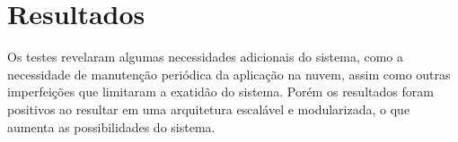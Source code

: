 \section{Resultados}
\label{Sec:6-resultados}

Os testes revelaram algumas necessidades adicionais do sistema, como a necessidade de manutenção periódica da aplicação na nuvem, assim como outras imperfeições que limitaram a exatidão do sistema. Porém os resultados foram positivos ao resultar em uma arquitetura escalável e modularizada, o que aumenta as possibilidades do sistema.